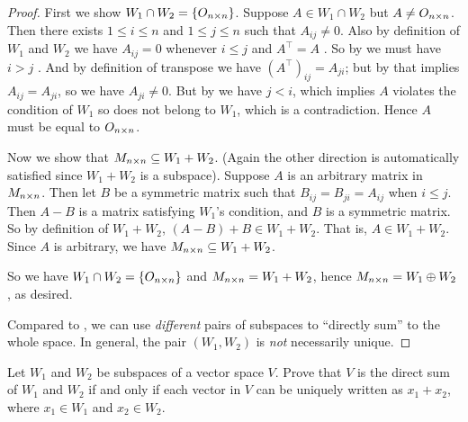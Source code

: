 \begin{proof}
First we show \(W_1 \cap W_2 = \{ O_{n \times n} \}\).
Suppose \(A \in W_1 \cap W_2\) but \(A \ne O_{n \times n}\).
Then there exists \(1 \le i \le n\) and \(1 \le j \le n\) such that \(A_{ij} \ne 0\).
Also by definition of \(W_1\) and \(W_2\) we have \(A_{ij} = 0\) whenever \(i \le j\)  and \(A^\top = A\) .
So by  we must have \(i > j\) .
And by definition of transpose we have \((A^\top)_{ij} = A_{ji}\);
but by  that implies \(A_{ij} = A_{ji}\), so we have \(A_{ji} \ne 0\).
But by  we have \(j < i\), which implies \(A\) violates the condition of \(W_1\) so does not belong to \(W_1\), which is a contradiction.
Hence \(A\) must be equal to \(O_{n \times n}\).

Now we show that \(M_{n \times n} \subseteq W_1 + W_2\).
(Again the other direction is automatically satisfied since \(W_1 + W_2\) is a subspace).
Suppose \(A\) is an arbitrary matrix in \(M_{n \times n}\).
Then let \(B\) be a symmetric matrix such that \(B_{ij} = B_{ji} = A_{ij}\) when \(i \le j\).
Then \(A - B\) is a matrix satisfying \(W_1\)'s condition, and \(B\) is a symmetric matrix.
So by definition of \(W_1 + W_2\), \((A - B) + B \in W_1 + W_2\).
That is, \(A \in W_1 + W_2\).
Since \(A\) is arbitrary, we have \(M_{n \times n} \subseteq W_1 + W_2\).

So we have \(W_1 \cap W_2 = \{ O_{n \times n} \}\) and \(M_{n \times n} = W_1 + W_2\), hence \(M_{n \times n} = W_1 \oplus W_2\), as desired.

Compared to , we can use \emph{different} pairs of subspaces to ``directly sum'' to the whole space.
In general, the pair \((W_1, W_2)\) is \emph{not} necessarily unique.
\end{proof}

\begin{exercise} \label{exercise 1.3.30}
Let \(W_1\) and \(W_2\) be subspaces of a vector space \(V\).
Prove that \(V\) is the direct sum of \(W_1\) and \(W_2\) if and only if each vector in \(V\) can be uniquely written as \(x_1 + x_2\), where \(x_1 \in W_1\) and \(x_2 \in W_2\).
\end{exercise}

